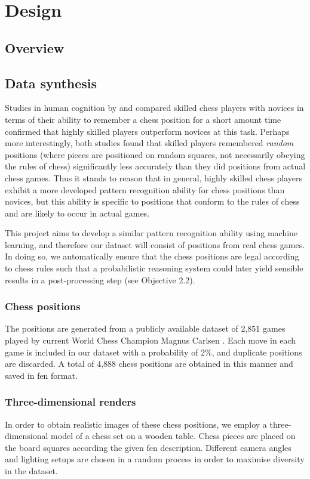 \documentclass[../main.tex]{subfiles}
\begin{document}
\chapter{Design}
\section{Overview}

\section{Data synthesis}
Studies in human cognition by \textcite{bilalic2010} and \textcite{zhou2018} compared skilled chess players with novices in terms of their ability to remember a chess position for a short amount time confirmed that highly skilled players outperform novices at this task.
Perhaps more interestingly, both studies found that skilled players remembered \emph{random} positions (where pieces are positioned on random squares, not necessarily obeying the rules of chess) significantly less accurately than they did positions from actual chess games. 
Thus it stands to reason that in general, highly skilled chess players exhibit a more developed pattern recognition ability for chess positions than novices, but this ability is specific to positions that conform to the rules of chess and are likely to occur in actual games.

This project aims to develop a similar pattern recognition ability using machine learning, and therefore our dataset will consist of positions from real chess games. 
In doing so, we automatically ensure that the chess positions are legal according to chess rules such that a probabilistic reasoning system could later yield sensible results in a post-processing step (see Objective 2.2).

\subsection{Chess positions}
The positions are generated from a publicly available dataset of 2,851 games played by current World Chess Champion Magnus Carlsen \cite{64squares2020}.
Each move in each game is included in our dataset with a probability of 2\%, and duplicate positions are discarded.
A total of 4,888 chess positions are obtained in this manner and saved in \gls{fen} format.

\subsection{Three-dimensional renders}
In order to obtain realistic images of these chess positions, we employ a three-dimensional model of a chess set on a wooden table. 
Chess pieces are placed on the board squares according the given \gls{fen} description. 
Different camera angles and lighting setups are chosen in a random process in order to maximise diversity in the dataset.
\end{document}
